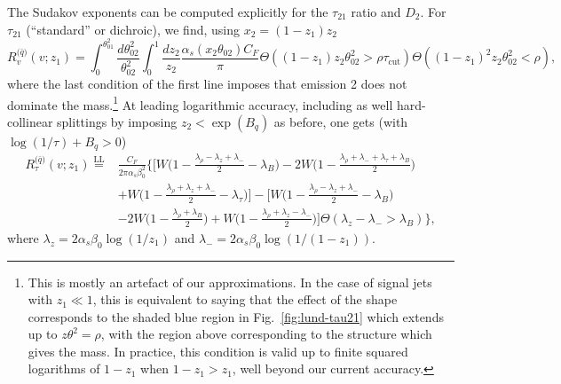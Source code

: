 The Sudakov exponents can be computed explicitly for the $\tau_{21}$
ratio and $D_2$.
%
For $\tau_{21}$ (``standard'' or dichroic), we find, using
$x_2=(1-z_1)z_2$
\begin{equation}
  R_v^\text{($\bar q$)}(v;z_1)
  = \int_0^{\theta_{01}^2} \frac{d\theta_{02}^2}{\theta_{02}^2}
  \int_0^1 \frac{dz_2}{z_2}
  \frac{\alpha_s(x_2\theta_{02})C_F}{\pi}
  \Theta((1-z_1)z_2\theta_{02}^2>\rho\tau_\text{cut})
  \Theta((1-z_1)^2z_2\theta_{02}^2<\rho),
\end{equation}
where the last condition of the first line imposes that emission 2
does not dominate the mass.\footnote{This is mostly an artefact of our
  approximations. In the case of signal jets with $z_1\ll 1$, this is
  equivalent to saying that the effect of the shape corresponds to the
  shaded blue region in Fig.~\ref{fig:lund-tau21} which extends up to
  $z\theta^2=\rho$, with the region above corresponding to the
  structure which gives the mass. In practice, this condition is valid
  up to finite squared logarithms of $1-z_1$ when $1-z_1>z_1$, \ie
  well beyond our current accuracy.}
%
At leading logarithmic accuracy, including as well
hard-collinear splittings by imposing $z_2<\exp(B_q)$ as before, one
gets (with $\log(1/\tau)+B_q>0$)
\begin{align}
  R_\tau^\text{($\bar q$)}(v;z_1) \overset{\text{LL}}=
  & \frac{C_F}{2\pi\alpha_s\beta_0^2}\bigg\{
    \bigg[ W\Big(1-\frac{\lambda_\rho-\lambda_z+\lambda_-}{2}-\lambda_B\Big)
        -2 W\Big(1-\frac{\lambda_\rho+\lambda_-+\lambda_\tau+\lambda_B}{2}\Big)
    \nonumber\\
  & + W\Big(1-\frac{\lambda_\rho+\lambda_z+\lambda_-}{2}-\lambda_\tau\Big)\bigg]
    -\bigg[W\Big(1-\frac{\lambda_\rho-\lambda_z+\lambda_-}{2}-\lambda_B\Big)\\
  & -2 W\Big(1-\frac{\lambda_\rho+\lambda_B}{2}\Big)
    + W\Big(1-\frac{\lambda_\rho+\lambda_z-\lambda_-}{2}\Big)\bigg]
    \Theta(\lambda_z-\lambda_->\lambda_B)\bigg\},\nonumber
\end{align}
where $\lambda_z=2\alpha_s\beta_0\log(1/z_1)$ and $\lambda_-=2\alpha_s\beta_0\log(1/(1-z_1))$.

